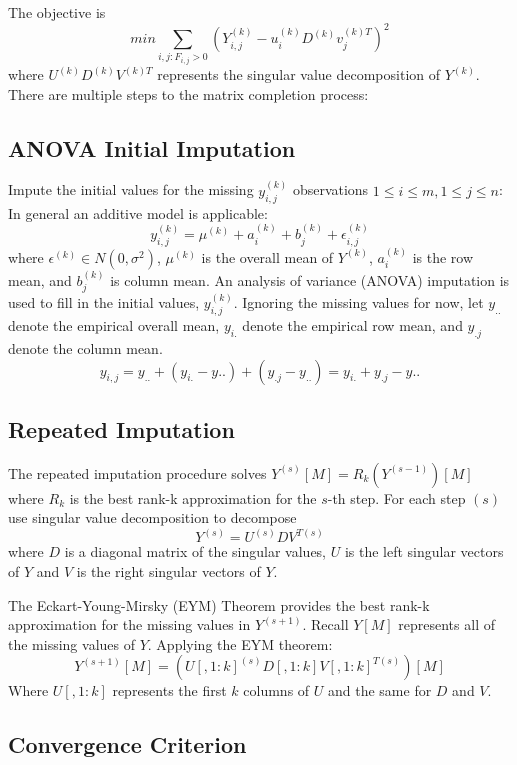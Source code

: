 \documentclass[12pt,twoside]{dukestatscithesis}
\theoremstyle{definition}
\theoremstyle{definition}
\theoremstyle{definition}
\theoremstyle{remark}
\begin{document}
The objective is
\[min \sum_{i,j:F_{i,j} > 0} (Y^{(k)}_{i,j} - u^{(k)}_iD^{(k)}v^{(k)T}_j)^2\]
where \(U^{(k)}D^{(k)}V^{(k)T}\) represents the singular value
decomposition of \(Y^{(k)}\). There are multiple steps to the matrix
completion process:

\subsection{ANOVA Initial Imputation}\label{anova-initial-imputation}

Impute the initial values for the missing \(y^{(k)}_{i,j}\) observations
\(1 \leq i \leq m, 1 \leq j \leq n\): In general an additive model is
applicable:
\[y^{(k)}_{i,j} = \mu^{(k)} + a^{(k)}_i + b^{(k)}_j + \epsilon^{(k)}_{i,j}\]
where \(\epsilon^{(k)} \in N(0,\sigma^2)\), \(\mu^{(k)}\) is the overall
mean of \(Y^{(k)}\), \(a^{(k)}_i\) is the row mean, and \(b^{(k)}_j\) is
column mean. An analysis of variance (ANOVA) imputation is used to fill
in the initial values, \(y^{(k)}_{i,j}\). Ignoring the missing values
for now, let \(y_{..}\) denote the empirical overall mean, \(y_{i.}\)
denote the empirical row mean, and \(y_{.j}\) denote the column mean.
\[y_{i,j} = y_{..} + (y_{i.}-y{..}) + (y_{.j}-y_{..}) = y_{i.} + y_{.j} - y{..}\]

\subsection{Repeated Imputation}\label{repeated-imputation}

The repeated imputation procedure solves
\(Y^{(s)}[M] = R_k(Y^{(s-1)})[M]\) where \(R_k\) is the best rank-k
approximation for the \(s\)-th step. For each step \((s)\) use singular
value decomposition to decompose \[Y^{(s)} =  U^{(s)}DV^{T(s)}\] where
\(D\) is a diagonal matrix of the singular values, \(U\) is the left
singular vectors of \(Y\) and \(V\) is the right singular vectors of
\(Y\).

The Eckart-Young-Mirsky (EYM) Theorem provides the best rank-k
approximation for the missing values in \(Y^{(s+1)}\). Recall \(Y[M]\)
represents all of the missing values of \(Y\). Applying the EYM theorem:
\[Y^{(s+1)}[M] = (U[,1:k]^{(s)}D[,1:k]V[,1:k]^{T(s)})[M]\] Where
\(U[,1:k]\) represents the first \(k\) columns of \(U\) and the same for
\(D\) and \(V\).

\subsection{Convergence Criterion}\label{convergence-criterion}
\end{document}
